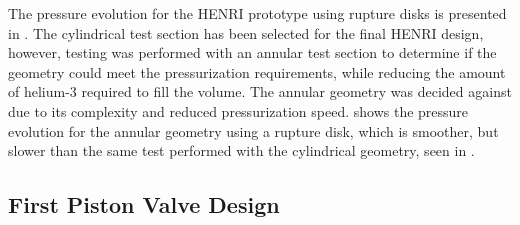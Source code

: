 The pressure evolution for the HENRI prototype using rupture disks is presented in . The cylindrical test section has been selected for the final HENRI design, however, testing was performed with an annular test section to determine if the geometry could meet the pressurization requirements, while reducing the amount of helium-3 required to fill the volume. The annular geometry was decided against due to its complexity and reduced pressurization speed.  shows the pressure evolution for the annular geometry using a rupture disk, which is smoother, but slower than the same test performed with the cylindrical geometry, seen in .

\subsection{First Piston Valve Design}

